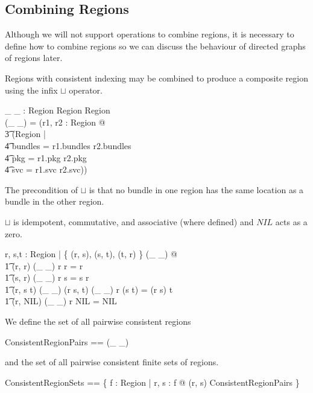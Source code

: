 \documentclass[a4paper,9pt]{article}
\begin{document}
\subsection{Combining Regions}

Although we will not support operations to combine regions, it is necessary to define how to combine
regions so we can discuss the behaviour of directed graphs of regions later.

Regions with consistent indexing may be combined to produce a composite region using the infix $\sqcup$ operator.
\begin{axdef}
 \_ \sqcup \_ : Region \cross Region \pfun Region \\
\where
 (\_ \sqcup \_) = (\lambda r1, r2 : Region @ \\
\t3 (\mu Region | \\
\t4 bundles = r1.bundles \cup r2.bundles \land \\
\t4 pkg = r1.pkg \cup r2.pkg \land \\
\t4 svc = r1.svc \cup r2.svc)) \\
\end{axdef}
The precondition of $\sqcup$ is that no bundle in one region has the same location as a bundle in the other region.

$\sqcup$ is idempotent, commutative, and associative (where defined) and $NIL$ acts as a zero.
\begin{argue}
  \shows \forall r, s,t : Region | \{ (r, s), (s, t), (t, r) \} \subseteq \dom(\_ \sqcup \_) @ \\
\t1 (r, r) \in \dom(\_ \sqcup \_) \land r \sqcup r = r \land \\
\t1 (s, r) \in \dom(\_ \sqcup \_) \land r \sqcup s = s \sqcup r \land \\
\t1 (r, s \sqcup t) \in \dom(\_ \sqcup \_) \land (r \sqcup s, t) \in \dom(\_ \sqcup \_) \land r \sqcup (s \sqcup t) = (r \sqcup s) \sqcup t \land \\
\t1 (r, NIL) \in \dom(\_ \sqcup \_) \land r \sqcup NIL = NIL \\
\end{argue}

We define the set of all pairwise consistent regions
\begin{zed}
  ConsistentRegionPairs == \dom(\_ \sqcup \_) \\
\end{zed}
and the set of all pairwise consistent finite sets of regions.
\begin{zed}
  ConsistentRegionSets == \{ f : \finset Region | \forall r, s : f @ (r, s) \in ConsistentRegionPairs \} \\
\end{zed}
\end{document}

